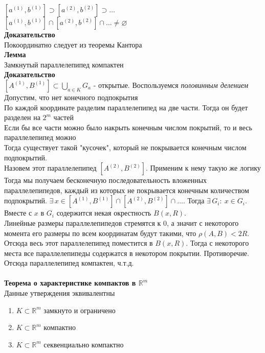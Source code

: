 \documentclass[12pt]{article}
\begin{document}
$[a^{(1)},b^{(1)}] \supset [a^{(2)},b^{(2)}] \supset \ldots$\\
$[a^{(1)},b^{(1)}] \cap [a^{(2)},b^{(2)}] \cap \ldots \neq \varnothing$\\
\textbf{Доказательство}\\
Покоординатно следует из теоремы Кантора\\
\textbf{Лемма}\\
Замкнутый параллелепипед компактен\\
\textbf{Доказательство}\\
$[A^{(1)},B^{(1)}] \subset \bigcup_{a\in K} G_a$ - открытые.
Воспользуемся \textit{половинным делением}\\
Допустим, что нет конечного подпокрытия\\
По каждой координате разделим параллелепипед на две части. Тогда он будет разделен на $2^m$ частей\\
Если бы все части можно было накрыть конечным числом покрытий, то и весь параллелепипед можно\\
Тогда существует такой "кусочек", который не покрывается конечным числом подпокрытий.\\
Назовем этот параллелепипед $[A^{(2)}, B^{(2)}]$. Применим к нему такую же логику\\
Тогда мы получаем бесконечную последовательность вложенных параллелепипедов, каждый из которых не покрывается конечным количеством подпокрытий. $\exists\,x \in [A^{(1)}, B^{(1)}] \cap [A^{(2)}, B^{(2)}] \cap \ldots$. Тогда $\exists\,G_i:\ x \in G_i$. Вместе с $x$ в $G_i$ содержится некая окрестность $B(x, R)$.\\
Линейные размеры параллелепипедов стремятся к 0, а значит с некоторого момента его размеры по всем координатам будут такими, что $\rho(A,B) < 2R$. Отсюда весь этот параллелепипед поместится в $B(x, R)$. Тогда с некоторого места все параллелепипеды содержатся в некотором покрытии. Противоречие.\\
Отсюда параллелепипед компактен, ч.т.д.\\\\
\textbf{Теорема о характеристике компактов в $\mathbb{R}^m$}\\
Данные утверждения эквивалентны
\begin{enumerate}
    \item $K \subset \mathbb{R}^m$ замкнуто и ограничено
    \item $K \subset \mathbb{R}^m$ компактно
    \item $K \subset \mathbb{R}^m$ секвенциально компактно
\end{enumerate}
\end{document}
